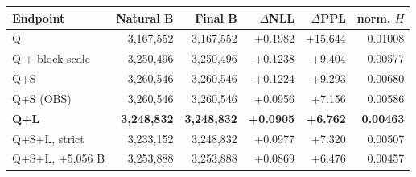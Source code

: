 \begin{tabular}{lrrrrr}
\toprule
Endpoint & Natural B & Final B & $\Delta$NLL & $\Delta$PPL & norm. $H$ \\
\midrule
Q & 3,167,552 & 3,167,552 & +0.1982 & +15.644 & 0.01008 \\
Q + block scale & 3,250,496 & 3,250,496 & +0.1238 & +9.404 & 0.00577 \\
Q+S & 3,260,546 & 3,260,546 & +0.1224 & +9.293 & 0.00680 \\
Q+S (OBS) & 3,260,546 & 3,260,546 & +0.0956 & +7.156 & 0.00586 \\
\textbf{Q+L} & \textbf{3,248,832} & \textbf{3,248,832} & \textbf{+0.0905} & \textbf{+6.762} & \textbf{0.00463} \\
Q+S+L, strict & 3,233,152 & 3,248,832 & +0.0977 & +7.320 & 0.00507 \\
Q+S+L, +5{,}056 B & 3,253,888 & 3,253,888 & +0.0869 & +6.476 & 0.00457 \\
\bottomrule
\end{tabular}
